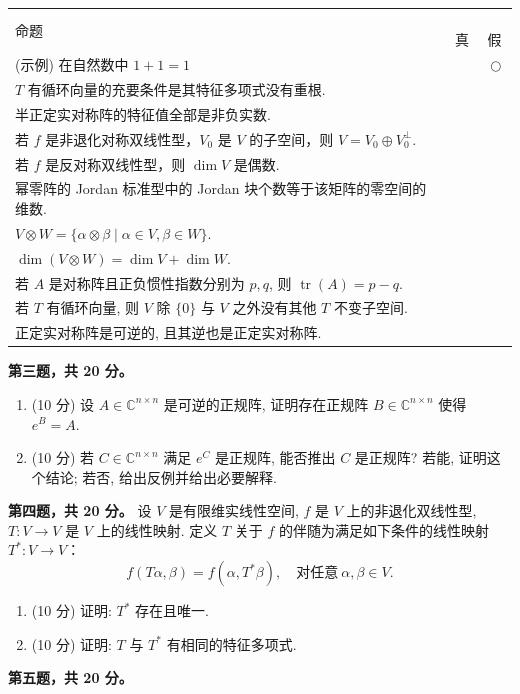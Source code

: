 \begin{center}\begin{tabular}{lcc}
命题 & \,真\, & \,假\, \\
(示例) 在自然数中 $1+1=1$ & & $\bigcirc$ \\
$T$ 有循环向量的充要条件是其特征多项式没有重根. & & \\
半正定实对称阵的特征值全部是非负实数. & & \\
若 $f$ 是非退化对称双线性型，$V_0$ 是 $V$ 的子空间，则 $V=V_0\oplus V_0^\perp$. & & \\
若 $f$ 是反对称双线性型，则 $\dim V$ 是偶数. & & \\
幂零阵的 Jordan 标准型中的 Jordan 块个数等于该矩阵的零空间的维数. & & \\
$V\otimes W=\{\alpha\otimes\beta\mid \alpha\in V,\beta\in W\}$. & & \\
$\dim(V\otimes W)=\dim V+\dim W$. & & \\
若 $A$ 是对称阵且正负惯性指数分别为 $p,q$, 则 $\operatorname{tr}(A)=p-q$. & & \\
若 $T$ 有循环向量, 则 $V$ 除 $\{0\}$ 与 $V$ 之外没有其他 $T$ 不变子空间. & & \\
正定实对称阵是可逆的, 且其逆也是正定实对称阵. & & 
\end{tabular}\end{center}
\textbf{第三题，共 20 分。}
\begin{enumerate}
\item (10 分) 设 $A\in\mathbb{C}^{n\times n}$ 是可逆的正规阵, 
证明存在正规阵 $B\in\mathbb{C}^{n\times n}$ 使得 $e^B=A$.
\item (10 分) 若 $C\in\mathbb{C}^{n\times n}$ 满足 $e^C$ 是正规阵, 
能否推出 $C$ 是正规阵? 若能, 证明这个结论; 若否, 给出反例并给出必要解释.
\end{enumerate}

\textbf{第四题，共 20 分。} 设 $V$ 是有限维实线性空间, $f$ 是 $V$ 上的非退化双线性型, $T:V\to V$ 是 $V$ 上的线性映射. 定义 $T$ 关于 $f$ 的伴随为满足如下条件的线性映射 $T^*:V\to V$：
\[f(T\alpha,\beta)=f(\alpha,T^*\beta),\quad \text{对任意}\ \alpha,\beta\in V.\]
\begin{enumerate}
\item (10 分) 证明: $T^*$ 存在且唯一.
\item (10 分) 证明: $T$ 与 $T^*$ 有相同的特征多项式.
\end{enumerate}
\textbf{第五题，共 20 分。}

